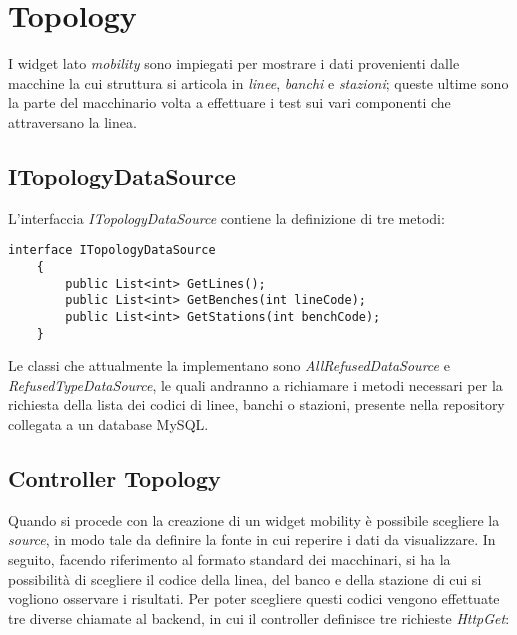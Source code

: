 \section{Topology}
\label{chap:topology}
I widget lato \textit{mobility} sono impiegati per mostrare i dati provenienti dalle macchine la cui struttura si articola in \textit{linee}, \textit{banchi} e \textit{stazioni}; queste ultime sono la parte del macchinario volta a effettuare i test sui vari componenti che attraversano la linea.

\subsection{ITopologyDataSource}
L'interfaccia \textit{ITopologyDataSource} contiene la definizione di tre metodi:

\begin{lstlisting}[caption={TopologyController.cs}, style=javaScriptCode]
    interface ITopologyDataSource
    {
        public List<int> GetLines();
        public List<int> GetBenches(int lineCode);
        public List<int> GetStations(int benchCode);
    }
\end{lstlisting}
Le classi che attualmente la implementano sono \textit{AllRefusedDataSource} e\\ \textit{RefusedTypeDataSource}, le quali andranno a richiamare i metodi necessari per la richiesta della lista dei codici di linee, banchi o stazioni, presente nella repository collegata a un database MySQL.

\subsection{Controller Topology}
Quando si procede con la creazione di un widget mobility è possibile scegliere la \textit{source}, in modo tale da definire la fonte in cui reperire i dati da visualizzare. In seguito,  facendo riferimento al formato standard dei macchinari, si ha la possibilità di scegliere il codice della linea, del banco e della stazione di cui si vogliono osservare i risultati.
Per poter scegliere questi codici vengono effettuate tre diverse chiamate al backend, in cui il controller definisce tre richieste \textit{HttpGet}:

